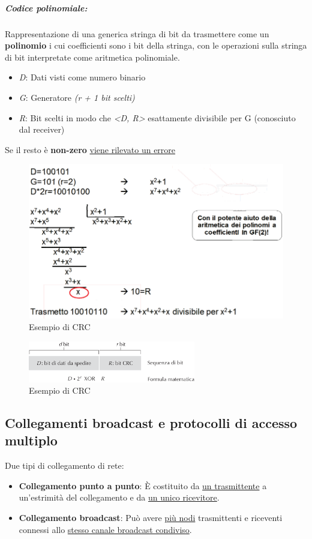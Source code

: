 \documentclass[12pt]{article}
\begin{document}
    \subparagraph{Codice polinomiale:} Rappresentazione di una generica stringa di bit da trasmettere come un \textbf{polinomio} i cui coefficienti sono i bit della stringa, con le operazioni sulla stringa di bit interpretate come aritmetica polinomiale.

    \begin{itemize}
        \item \textit{D}: Dati visti come numero binario
        \item \textit{G}: Generatore \textit{(r + 1 bit scelti)}
        \item \textit{R}: Bit scelti in modo che \textit{<D, R>} esattamente divisibile per G (conosciuto dal receiver)
    \end{itemize}
    Se il resto è \textbf{non-zero} \underline{viene rilevato un errore}

    \begin{figure}[!htb]
        \centering
        \includegraphics[width=1\textwidth]{crc1.PNG}
        \caption{Esempio di CRC}
    \end{figure}
    \FloatBarrier

    \begin{figure}[!htb]
        \centering
        \includegraphics[width=0.65\textwidth]{crc2.PNG}
        \caption{Esempio di CRC}
    \end{figure}
    \FloatBarrier

    \subsection{Collegamenti broadcast e protocolli di accesso multiplo}
    Due tipi di collegamento di rete:
    \begin{itemize}
        \item \textbf{Collegamento punto a punto}: È costituito da \underline{un trasmittente} a un'estrimità del collegamento e da \underline{un unico ricevitore}.
        \item \textbf{Collegamento broadcast}: Può avere \underline{più nodi} trasmittenti e riceventi connessi allo \underline{stesso canale broadcast condiviso}.
    \end{itemize}
    
\end{document}
